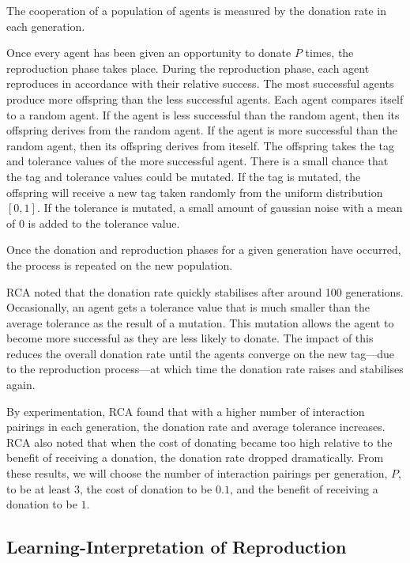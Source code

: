 The cooperation of a population of agents is measured by the donation rate in each generation.

Once every agent has been given an opportunity to donate $P$ times,
the reproduction phase takes place.  During the reproduction phase,
each agent reproduces in accordance with their relative success.
The most successful agents produce more offspring than the less
successful agents.  Each agent compares itself to a random agent.
If the agent is less successful than the random agent, then its
offspring derives from the random agent.  If the agent is more
successful than the random agent, then its offspring derives from
iteself.  The offspring takes the tag and tolerance values of the
more successful agent.  There is a small chance that the tag and
tolerance values could be mutated.  If the tag is mutated, the
offspring will receive a new tag taken randomly from the uniform
distribution $\left[0, 1\right]$.  If the tolerance is mutated, a
small amount of gaussian noise with a mean of $0$ is added to the
tolerance value.

Once the donation and reproduction phases for a given generation
have occurred, the process is repeated on the new population.

RCA noted that the donation rate quickly stabilises after around
100 generations.  Occasionally, an agent gets a tolerance value
that is much smaller than the average tolerance as the result of a
mutation.  This mutation allows the agent to become more successful
as they are less likely to donate.  The impact of this reduces the
overall donation rate until the agents converge on the new tag---due
to the reproduction process---at which time the donation rate raises
and stabilises again.

By experimentation, RCA found that with a higher number of interaction
pairings in each generation, the donation rate and average tolerance
increases.  RCA also noted that when the cost of donating became
too high relative to the benefit of receiving a donation, the
donation rate dropped dramatically.  From these results, we will
choose the number of interaction pairings per generation, $P$, to
be at least $3$, the cost of donation to be $0.1$, and the benefit
of receiving a donation to be $1$.

\subsection{Learning-Interpretation of Reproduction}

